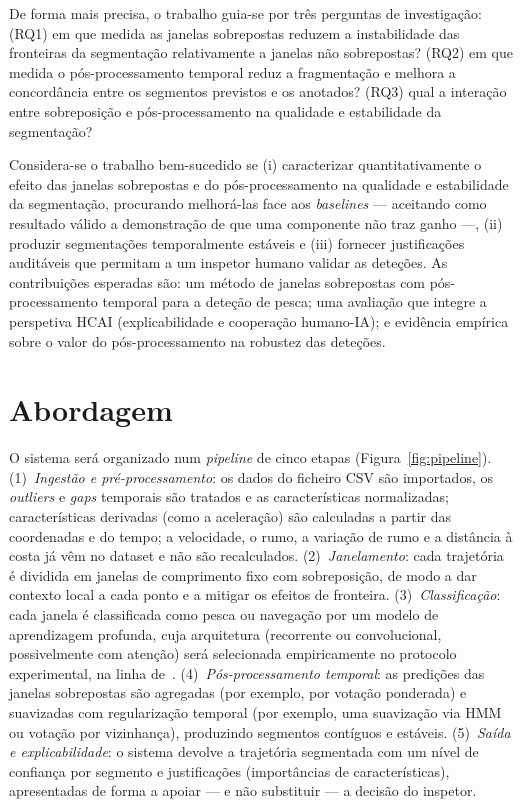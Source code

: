 \documentclass{article}
\begin{document}
De forma mais precisa, o trabalho guia-se por tr\^es perguntas de investiga\c{c}\~ao:
(RQ1) em que medida as janelas sobrepostas reduzem a instabilidade das fronteiras da
segmenta\c{c}\~ao relativamente a janelas n\~ao sobrepostas? (RQ2) em que medida o
p\'os-processamento temporal reduz a fragmenta\c{c}\~ao e melhora a concord\^ancia entre
os segmentos previstos e os anotados? (RQ3) qual a intera\c{c}\~ao entre sobreposi\c{c}\~ao
e p\'os-processamento na qualidade e estabilidade da segmenta\c{c}\~ao?

Considera-se o trabalho bem-sucedido se (i) caracterizar quantitativamente o efeito das
janelas sobrepostas e do p\'os-processamento na qualidade e estabilidade da
segmenta\c{c}\~ao, procurando melhor\'a-las face aos \emph{baselines} --- aceitando como
resultado v\'alido a demonstra\c{c}\~ao de que uma componente n\~ao traz ganho ---, (ii)
produzir segmenta\c{c}\~oes temporalmente est\'aveis e (iii) fornecer justifica\c{c}\~oes
audit\'aveis que permitam a um inspetor humano validar as dete\c{c}\~oes. As contribui\c{c}\~oes esperadas s\~ao: um m\'etodo de janelas sobrepostas
com p\'os-processamento temporal para a dete\c{c}\~ao de pesca; uma avalia\c{c}\~ao que
integre a perspetiva HCAI (explicabilidade e coopera\c{c}\~ao humano-IA); e evid\^encia
emp\'irica sobre o valor do p\'os-processamento na robustez das dete\c{c}\~oes.

\section{Abordagem}
\label{sec:abordagem}

O sistema ser\'a organizado num \emph{pipeline} de cinco etapas (Figura~\ref{fig:pipeline}). (1)~\emph{Ingest\~ao e
pr\'e-processamento}: os dados do ficheiro CSV s\~ao importados, os \emph{outliers} e \emph{gaps} temporais s\~ao
tratados e as caracter\'isticas normalizadas; caracter\'isticas derivadas (como a acelera\c{c}\~ao) s\~ao calculadas a partir das
coordenadas e do tempo; a velocidade, o rumo, a varia\c{c}\~ao de rumo e a dist\^ancia \`a
costa j\'a v\^em no dataset e n\~ao s\~ao recalculados. (2)~\emph{Janelamento}: cada trajet\'oria \'e dividida em
janelas de comprimento fixo com sobreposi\c{c}\~ao, de modo a dar contexto local a cada
ponto e a mitigar os efeitos de fronteira. (3)~\emph{Classifica\c{c}\~ao}: cada janela \'e
classificada como pesca ou navega\c{c}\~ao por um modelo de aprendizagem profunda, cuja
arquitetura (recorrente ou convolucional, possivelmente com aten\c{c}\~ao) ser\'a selecionada
empiricamente no protocolo experimental, na linha de~\cite{cheng2025,wang2026}. (4)~\emph{P\'os-processamento temporal}: as
predi\c{c}\~oes das janelas sobrepostas s\~ao agregadas (por exemplo, por vota\c{c}\~ao
ponderada) e suavizadas com regulariza\c{c}\~ao temporal (por exemplo, uma suaviza\c{c}\~ao
via HMM ou vota\c{c}\~ao por vizinhan\c{c}a), produzindo segmentos cont\'iguos e
est\'aveis. (5)~\emph{Sa\'ida e explicabilidade}: o sistema devolve a trajet\'oria
segmentada com um n\'ivel de confian\c{c}a por segmento e justifica\c{c}\~oes
(import\^ancias de caracter\'isticas), apresentadas de forma a apoiar --- e n\~ao substituir
--- a decis\~ao do inspetor.
\end{document}
